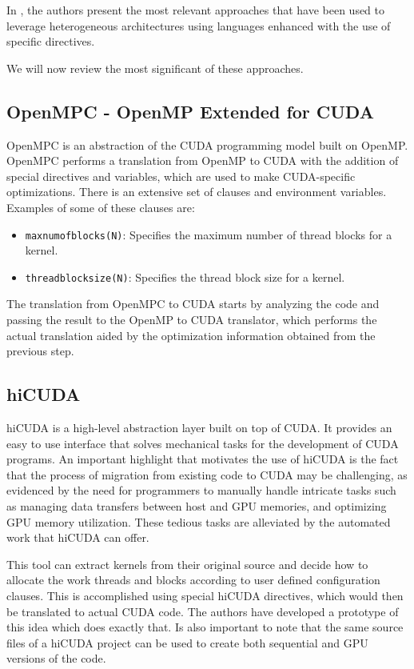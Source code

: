 In \cite{Grillo:2013:PGD}, the authors present the most relevant approaches that have been used to leverage heterogeneous architectures using languages enhanced with the use of specific directives.

We will now review the most significant of these approaches.

\subsection{OpenMPC - OpenMP Extended for CUDA}

OpenMPC \cite{Lee:2010:OpenMPC} is an abstraction of the CUDA programming model built on OpenMP.
OpenMPC performs a translation from OpenMP to CUDA with the addition of special directives and variables, which are used to make CUDA-specific optimizations.
There is an extensive set of clauses and environment variables.
Examples of some of these clauses are:
\begin{itemize}
    \item \texttt{maxnumofblocks(N)}: Specifies the maximum number of thread blocks for a kernel.
    \item \texttt{threadblocksize(N)}: Specifies the thread block size for a kernel.
\end{itemize}
The translation from OpenMPC to CUDA starts by analyzing the code and passing the result to the OpenMP to CUDA translator, which performs the actual translation aided by the optimization information obtained from the previous step.

\subsection{hiCUDA}

hiCUDA \cite{Han:2011:hiCUDA} is a high-level abstraction layer built on top of CUDA.
It provides an easy to use interface that solves mechanical tasks for the development of CUDA programs.
An important highlight that motivates the use of hiCUDA is the fact that the process of migration from existing code to CUDA may be challenging, as evidenced by the need for programmers to manually handle intricate tasks such as managing data transfers between host and GPU memories, and optimizing GPU memory utilization.
These tedious tasks are alleviated by the automated work that hiCUDA can offer.

This tool can extract kernels from their original source and decide how to allocate the work threads and blocks according to user defined configuration clauses.
This is accomplished using special hiCUDA directives, which would then be translated to actual CUDA code.
The authors have developed a prototype of this idea which does exactly that.
Is also important to note that the same source files of a hiCUDA project can be used to create both sequential and GPU versions of the code.

